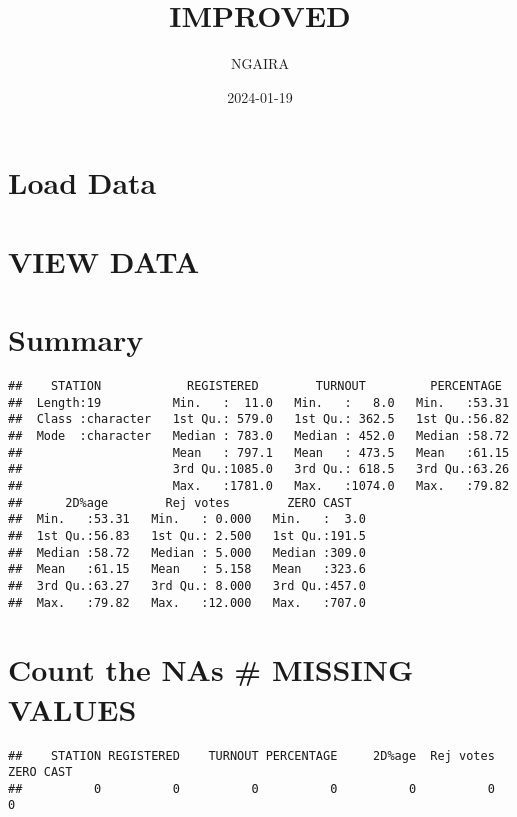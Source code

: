 \documentclass[
]{article}
\title{IMPROVED}
\author{NGAIRA}
\date{2024-01-19}
\begin{document}
\maketitle

\hypertarget{load-data}{%
\section{Load Data}\label{load-data}}

\hypertarget{view-data}{%
\section{VIEW DATA}\label{view-data}}

\hypertarget{summary}{%
\section{Summary}\label{summary}}

\begin{verbatim}
##    STATION            REGISTERED        TURNOUT         PERCENTAGE   
##  Length:19          Min.   :  11.0   Min.   :   8.0   Min.   :53.31  
##  Class :character   1st Qu.: 579.0   1st Qu.: 362.5   1st Qu.:56.82  
##  Mode  :character   Median : 783.0   Median : 452.0   Median :58.72  
##                     Mean   : 797.1   Mean   : 473.5   Mean   :61.15  
##                     3rd Qu.:1085.0   3rd Qu.: 618.5   3rd Qu.:63.26  
##                     Max.   :1781.0   Max.   :1074.0   Max.   :79.82  
##      2D%age        Rej votes        ZERO CAST    
##  Min.   :53.31   Min.   : 0.000   Min.   :  3.0  
##  1st Qu.:56.83   1st Qu.: 2.500   1st Qu.:191.5  
##  Median :58.72   Median : 5.000   Median :309.0  
##  Mean   :61.15   Mean   : 5.158   Mean   :323.6  
##  3rd Qu.:63.27   3rd Qu.: 8.000   3rd Qu.:457.0  
##  Max.   :79.82   Max.   :12.000   Max.   :707.0
\end{verbatim}

\hypertarget{count-the-nas-missing-values}{%
\section{Count the NAs \# MISSING
VALUES}\label{count-the-nas-missing-values}}

\begin{verbatim}
##    STATION REGISTERED    TURNOUT PERCENTAGE     2D%age  Rej votes  ZERO CAST 
##          0          0          0          0          0          0          0
\end{verbatim}
\end{document}

